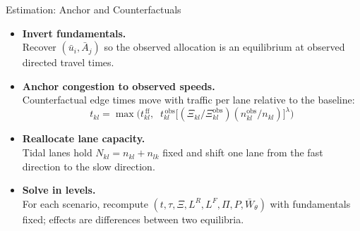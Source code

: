 \documentclass[11pt,aspectratio=169]{beamer}
\begin{document}
\begin{frame}{Estimation: Anchor and Counterfactuals}
\begin{itemize}\small
  \item \textbf{Invert fundamentals.}\\[-0.1em]
  {\footnotesize Recover $(\bar u_i,\bar A_j)$ so the observed allocation is an equilibrium at observed directed travel times.}
  \item \textbf{Anchor congestion to observed speeds.}\\[-0.1em]
  {\footnotesize Counterfactual edge times move with traffic per lane relative to the baseline:}
  \vspace{-0.35em}\begin{equation}\label{eq:anchor}
    t_{kl}=\max\!\Big( t_{kl}^{\,\mathrm{ff}},\;\;
    t_{kl}^{\,\mathrm{obs}}\big[(\Xi_{kl}/\Xi_{kl}^{\mathrm{obs}})(n_{kl}^{\mathrm{obs}}/n_{kl})\big]^{\lambda}\Big)
  \end{equation}
  \item \textbf{Reallocate lane capacity.}\\[-0.1em]
  {\footnotesize Tidal lanes hold $N_{kl}=n_{kl}+n_{lk}$ fixed and shift one lane from the fast direction to the slow direction.}
  \item \textbf{Solve in levels.}\\[-0.1em]
  {\footnotesize For each scenario, recompute $(t,\tau,\Xi,L^R,L^F,\Pi,P,\bar W_\theta)$ with fundamentals fixed; effects are differences between two equilibria.}
\end{itemize}
\end{frame}
\end{document}
